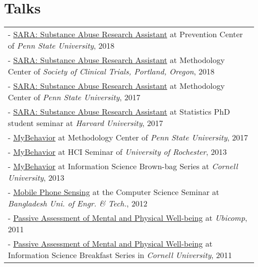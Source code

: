 \documentclass[10pt,fullpage]{article}
\begin{document}
\section*{\textbf{Talks}}
\vspace{-0.5em}
\begin{longtable}{>{\everypar{\hangindent0.5in}}p{6in}}
	- \underline{SARA: Substance Abuse Research Assistant} at Prevention Center of \textit{Penn State University}, 2018\\
	- \underline{SARA: Substance Abuse Research Assistant} at Methodology Center of \textit{Society of Clinical Trials, Portland, Oregon}, 2018\\
	- \underline{SARA: Substance Abuse Research Assistant} at Methodology Center of \textit{Penn State University}, 2017\\
	- \underline{SARA: Substance Abuse Research Assistant} at Statistics PhD student seminar at \textit{Harvard University}, 2017\\
	- \underline{MyBehavior} at Methodology Center of \textit{Penn State University}, 2017\\
	- \underline{MyBehavior} at HCI Seminar of \textit{University of Rochester}, 2013\\
	- \underline{MyBehavior} at Information Science Brown-bag Series at \textit{Cornell University}, 2013\\
	- \underline{Mobile Phone Sensing} at the Computer Science Seminar at \textit{Bangladesh Uni. of Engr. \& Tech.}, 2012\\
	- \underline{Passive Assessment of Mental and Physical Well-being} at \textit{Ubicomp}, 2011\\
	- \underline{Passive Assessment of Mental and Physical Well-being} at Information Science Breakfast Series in \textit{Cornell University}, 2011\\
\end{longtable}
\end{document}
